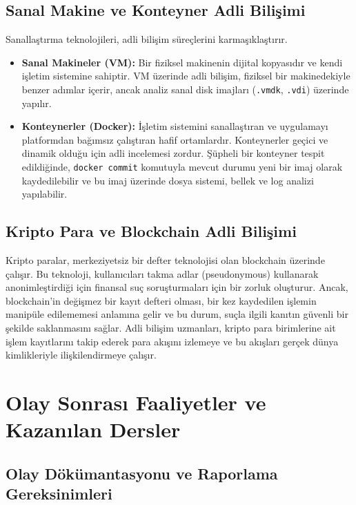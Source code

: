 \subsection{Sanal Makine ve Konteyner Adli Bilişimi}

Sanallaştırma teknolojileri, adli bilişim süreçlerini karmaşıklaştırır.

\begin{itemize}
    \item \textbf{Sanal Makineler (VM):} Bir fiziksel makinenin dijital kopyasıdır ve kendi işletim sistemine sahiptir. VM üzerinde adli bilişim, fiziksel bir makinedekiyle benzer adımlar içerir, ancak analiz sanal disk imajları (\texttt{.vmdk}, \texttt{.vdi}) üzerinde yapılır.
    \item \textbf{Konteynerler (Docker):} İşletim sistemini sanallaştıran ve uygulamayı platformdan bağımsız çalıştıran hafif ortamlardır. Konteynerler geçici ve dinamik olduğu için adli incelemesi zordur. Şüpheli bir konteyner tespit edildiğinde, \texttt{docker commit} komutuyla mevcut durumu yeni bir imaj olarak kaydedilebilir ve bu imaj üzerinde dosya sistemi, bellek ve log analizi yapılabilir.
\end{itemize}

\subsection{Kripto Para ve Blockchain Adli Bilişimi}

Kripto paralar, merkeziyetsiz bir defter teknolojisi olan blockchain üzerinde çalışır. Bu teknoloji, kullanıcıları takma adlar (pseudonymous) kullanarak anonimleştirdiği için finansal suç soruşturmaları için bir zorluk oluşturur. Ancak, blockchain'in değişmez bir kayıt defteri olması, bir kez kaydedilen işlemin manipüle edilememesi anlamına gelir ve bu durum, suçla ilgili kanıtın güvenli bir şekilde saklanmasını sağlar. Adli bilişim uzmanları, kripto para birimlerine ait işlem kayıtlarını takip ederek para akışını izlemeye ve bu akışları gerçek dünya kimlikleriyle ilişkilendirmeye çalışır.

\section{Olay Sonrası Faaliyetler ve Kazanılan Dersler}

\subsection{Olay Dökümantasyonu ve Raporlama Gereksinimleri}

